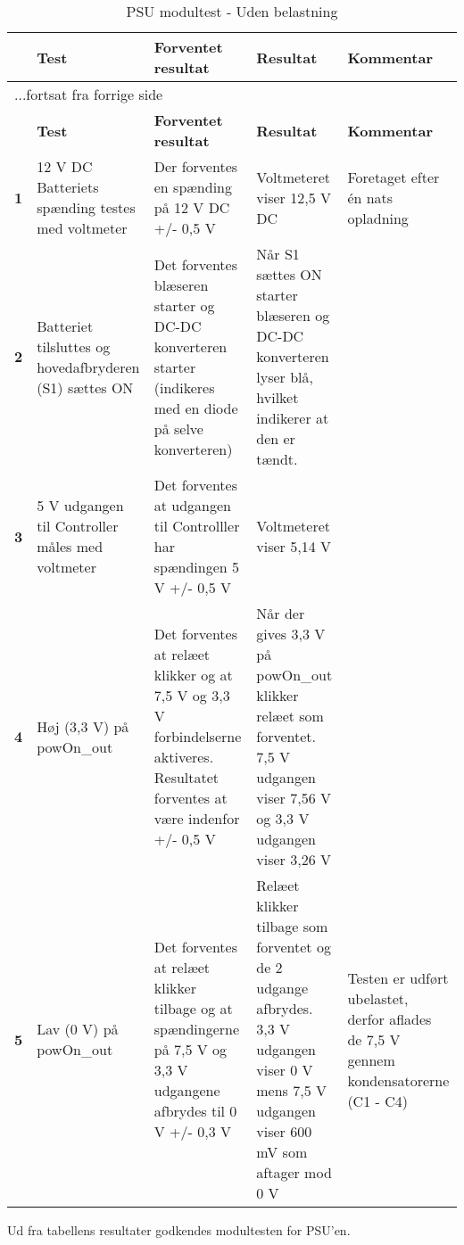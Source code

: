\begin{center}
\label{modultest_psu} 
\begin{longtable}{|p{}|p{}|p{}|p{}|p{}|} %
\caption{PSU modultest - Uden belastning}\\
\hline
\multicolumn{1}{|c|}{} &
\textbf{Test} &
\textbf{Forventet \newline resultat} &
\textbf{Resultat} &
\textbf{Kommentar} \\ \hline 
\endfirsthead

\multicolumn{5}{l}{...fortsat fra forrige side} \\ \hline 
\multicolumn{1}{|c|}{} &
\textbf{Test} &
\textbf{Forventet \newline resultat} &
\textbf{Resultat} &
\textbf{Kommentar} \\ \hline 
\endhead

\textbf{1}	&12 V DC Batteriets spænding testes med voltmeter
			&Der forventes en spænding på 12 V DC +/- 0,5 V
			&Voltmeteret viser 12,5 V DC
			&Foretaget efter én nats opladning  
			\\ \hline 
			
\textbf{2}	&Batteriet tilsluttes og hovedafbryderen (S1) sættes ON
			&Det forventes blæseren starter og DC-DC konverteren starter (indikeres med en diode på selve konverteren)
			&Når S1 sættes ON starter blæseren og DC-DC konverteren lyser blå, hvilket indikerer at den er tændt.
			&  \\ \hline 
			
\textbf{3}	&5 V udgangen til Controller måles med voltmeter
			&Det forventes at udgangen til Controlller har spændingen 5 V +/- 0,5 V
			&Voltmeteret viser 5,14 V
			&  \\ \hline 
			
\textbf{4}	&Høj (3,3 V) på powOn\_out 
			&Det forventes at relæet klikker og at 7,5 V og 3,3 V forbindelserne aktiveres. Resultatet forventes at være indenfor +/- 0,5 V
			&Når der gives 3,3 V på powOn\_out klikker relæet som forventet. 7,5 V udgangen viser 7,56 V og 3,3 V udgangen viser 3,26 V
			&  \\ \hline  
			
\textbf{5}	&Lav (0 V) på powOn\_out 
			&Det forventes at relæet klikker tilbage og at spændingerne på 7,5 V og 3,3 V udgangene afbrydes til 0 V +/- 0,3 V
			&Relæet klikker tilbage som forventet og de 2 udgange afbrydes. 3,3 V udgangen viser 0 V mens 7,5 V udgangen viser 600 mV som aftager mod 0 V
			&Testen er udført ubelastet, derfor aflades de 7,5 V gennem kondensatorerne (C1 - C4)  \\ \hline 					
					
\end{longtable}
\end{center}

Ud fra tabellens resultater godkendes modultesten for PSU'en. 